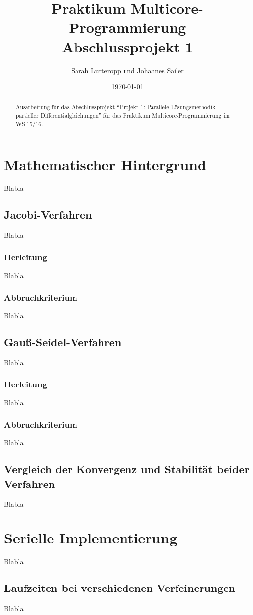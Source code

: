 \documentclass{article}
\title{Praktikum Multicore-Programmierung \\ Abschlussprojekt 1}
\author{Sarah Lutteropp und Johannes Sailer}
\date{\today}
\begin{document}
\maketitle


\begin{abstract}
Ausarbeitung für das Abschlussprojekt ``Projekt 1: Parallele Lösungsmethodik partieller Differentialgleichungen'' für das Praktikum Multicore-Programmierung im WS 15/16.
\end{abstract}

\section{Mathematischer Hintergrund}
Blabla
\subsection{Jacobi-Verfahren}
Blabla
\subsubsection{Herleitung}
Blabla
\subsubsection{Abbruchkriterium}
Blabla

\subsection{Gauß-Seidel-Verfahren}
Blabla
\subsubsection{Herleitung}
Blabla
\subsubsection{Abbruchkriterium}
Blabla

\subsection{Vergleich der Konvergenz und Stabilität beider Verfahren}
Blabla

\section{Serielle Implementierung}
Blabla
\subsection{Laufzeiten bei verschiedenen Verfeinerungen}
Blabla
\end{document}
